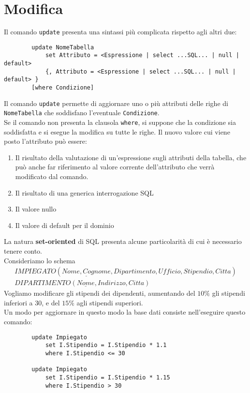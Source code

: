 \section{Modifica}
Il comando \texttt{update} presenta una sintassi più complicata rispetto agli altri due:
	\begin{lstlisting}
		update NomeTabella
			set Attributo = <Espressione | select ...SQL... | null | default>
			{, Attributo = <Espressione | select ...SQL... | null | default> }
		[where Condizione]
	\end{lstlisting}
Il comando \texttt{update} permette di aggiornare uno o più attributi delle righe di \texttt{NomeTabella} che soddisfano l'eventuale \texttt{Condizione}.\\
Se il comando non presenta la clausola \texttt{where}, si suppone che la condizione sia soddisfatta e si esegue la modifica su tutte le righe. Il nuovo valore cui viene posto l'attributo può essere:
	\begin{enumerate}
			\item {Il risultato della valutazione di un'espressione sugli attributi della tabella, che può anche far riferimento al valore corrente dell'attributo che verrà modificato dal comando.}
			\item {Il risultato di una generica interrogazione SQL}
			\item {Il valore nullo}
			\item {Il valore di default per il dominio}
	\end{enumerate}
La natura \textbf{set-oriented} di SQL presenta alcune particolarità di cui è necessario tenere conto.\\
Consideriamo  lo schema 
		\begin{equation}\begin{aligned}
			IMPIEGATO (\underline{Nome, Cognome}, Dipartimento, Ufficio, Stipendio, Citta)\\
			DIPARTIMENTO (\underline{Nome}, Indirizzo, Citta)
		\end{aligned}\end{equation}
Vogliamo modificare gli stipendi dei dipendenti, aumentando del $10\%$ gli stipendi inferiori a 30, e del $15\%$ agli stipendi superiori.\\
Un modo per aggiornare in questo modo la base dati consiste nell'eseguire questo comando:
	\begin{lstlisting}
		update Impiegato
			set I.Stipendio = I.Stipendio * 1.1
			where I.Stipendio <= 30
			
		update Impiegato
			set I.Stipendio = I.Stipendio * 1.15
			where I.Stipendio > 30
	\end{lstlisting}
